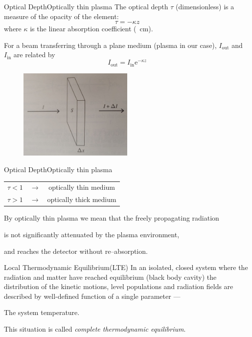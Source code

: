\documentclass[final]{beamer}
\begin{document}
\newcommand{\opticaldepth}{Optical Depth}
\begin{frame}{\opticaldepth}{Optically thin plasma}
  The optical depth $\tau$ (dimensionless) is a measure of the opacity of the element:
  \begin{equation*}
    \tau=-\kappa z
  \end{equation*}
  where $\kappa$ is the linear absorption coefficient (\si{\per\cm}).

  For a beam transferring through a plane medium (plasma in our case), $I_\text{out}$ and $I_\text{in}$ are related by
  \begin{equation*}
    I_\text{out} = I_\text{in}\mathrm{e}^{-\kappa z} %
  \end{equation*}

\begin{figure}
    \centering
    \includegraphics[width=0.5\textwidth]{figures/radiativeTransfer.jpg}
\end{figure}

\end{frame}
\begin{frame}{\opticaldepth}{Optically thin plasma}
 \begin{center}
\begin{tabular}{ c c c }
  $\tau<1$ & $\longrightarrow$ & optically thin medium\\ 
  $\tau>1$ & $\longrightarrow$ & optically thick medium
\end{tabular}
\end{center}
By optically thin plasma we mean that the freely propagating radiation

is not significantly attenuated by the plasma environment, 

and reaches the detector without re--absorption.
\end{frame}
\newcommand{\lte}{Local Thermodynamic Equilibrium(LTE)}
\begin{frame}{\lte}
  In an isolated, closed system where the radiation and matter have reached equilibrium (black body cavity) the distribution of the kinetic motions, level populations and radiation fields are described by well-defined function of a single parameter ---

  The system temperature.

  This situation is called \emph{complete thermodynamic equilibrium}.
\end{frame}
\end{document}
